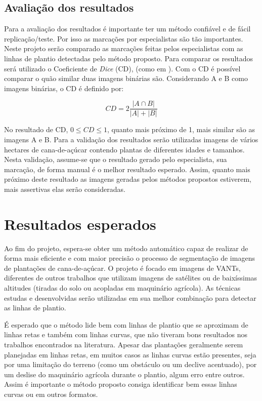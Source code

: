 \documentclass[12pt, a4paper, english, brazil]{article}
\begin{document}
\subsection{Avaliação dos resultados}

Para a avaliação dos resultados é importante ter um método confiável e de fácil replicação/teste. Por isso as marcações por especialistas são tão importantes. Neste projeto serão comparado as marcações feitas pelos especialistas com as linhas de plantio detectadas pelo método proposto. Para comparar os resultados será utilizado o Coeficiente de \textit{Dice} (CD), (como em ). Com o CD é possível comparar o quão similar duas imagens binárias são. Considerando A e B como imagens binárias, o CD é definido por:

\begin{equation}
    CD = 2 \frac{|A \cap B|}{|A| + |B|}
\end{equation}

No resultado de CD, $0 \le CD \le 1$, quanto mais próximo de 1, mais similar são as imagens A e B. Para a validação dos resultados serão utilizadas imagens de vários hectares de cana-de-açúcar contendo plantas de diferentes idades e tamanhos. Nesta validação, assume-se que o resultado gerado pelo especialista, sua marcação, de forma manual é o melhor resultado esperado. Assim, quanto mais próximo deste resultado as imagens geradas pelos métodos propostos estiverem, mais assertivas elas serão consideradas.

\section{Resultados esperados}

Ao fim do projeto, espera-se obter um método automático capaz de realizar de forma mais eficiente e com maior precisão o processo de segmentação de imagens de plantações de cana-de-açúcar. O projeto é focado em imagens de VANTs, diferentes de outros trabalhos que utilizam imagens de satélites ou de baixíssimas altitudes (tiradas do solo ou acopladas em maquinário agrícola). As técnicas estudas e desenvolvidas serão utilizadas em sua melhor combinação para detectar as linhas de plantio.

É esperado que o método lide bem com linhas de plantio que se aproximam de linhas retas e também com linhas curvas, que não tiveram bons resultados nos trabalhos encontrados na literatura. Apesar das plantações geralmente serem planejadas em linhas retas, em muitos casos as linhas curvas estão presentes, seja por uma limitação do terreno (como um obstáculo ou um declive acentuado), por um deslise do maquinário agrícola durante o plantio, algum erro entre outros. Assim é importante o método proposto consiga identificar bem essas linhas curvas ou em outros formatos.
\end{document}
